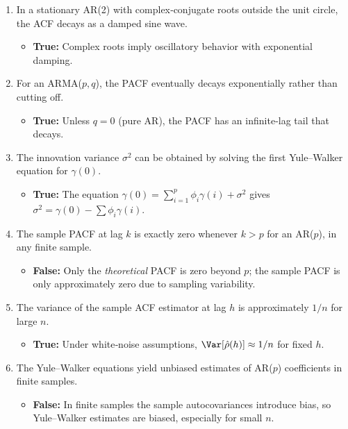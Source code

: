 \documentclass[11pt]{article}
\begin{document}
\begin{enumerate}
  \item In a stationary AR(2) with complex‐conjugate roots outside the unit circle, the ACF decays as a damped sine wave.
  \begin{itemize}
    \item \textbf{True:}  Complex roots imply oscillatory behavior with exponential damping.
  \end{itemize}

  \item For an ARMA($p,q$), the PACF eventually decays exponentially rather than cutting off.
  \begin{itemize}
    \item \textbf{True:}  Unless $q=0$ (pure AR), the PACF has an infinite‐lag tail that decays.
  \end{itemize}

  \item The innovation variance $\sigma^2$ can be obtained by solving the first Yule–Walker equation for $\gamma(0)$.
  \begin{itemize}
    \item \textbf{True:}  The equation $\gamma(0)=\sum_{i=1}^p\phi_i\gamma(i)+\sigma^2$ gives $\sigma^2=\gamma(0)-\sum\phi_i\gamma(i)$.
  \end{itemize}

  \item The sample PACF at lag $k$ is exactly zero whenever $k>p$ for an AR($p$), in any finite sample.
  \begin{itemize}
    \item \textbf{False:}  Only the \emph{theoretical} PACF is zero beyond $p$; the sample PACF is only approximately zero due to sampling variability.
  \end{itemize}

  \item The variance of the sample ACF estimator at lag $h$ is approximately $1/n$ for large $n$.
  \begin{itemize}
    \item \textbf{True:}  Under white‐noise assumptions, $\Var[\hat\rho(h)]\approx1/n$ for fixed $h$.
  \end{itemize}
    \item The Yule–Walker equations yield unbiased estimates of AR($p$) coefficients in finite samples.
  \begin{itemize}
    \item \textbf{False:} In finite samples the sample autocovariances introduce bias, so Yule–Walker estimates are biased, especially for small $n$.
  \end{itemize}


\end{enumerate}
\end{document}
